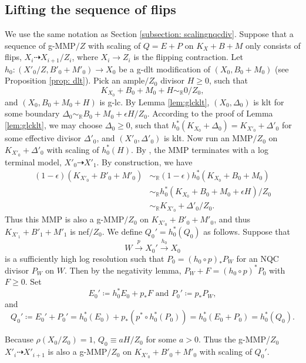 \documentclass[11pt]{amsart}
\newcommand{\Rr}{\mathbb{R}}
\begin{document}
\subsection{Lifting the sequence of flips}
\label{subsection: Lifting a sequence of flips with quasi-scaling}
We use the same notation as Section \ref{subsection: scalingnqcdiv}. Suppose that a sequence of g-MMP$/Z$ with scaling of $Q=E+P$ on $K_{X}+B+M$ only consists of flips, $X_i\dashrightarrow X_{i+1}/Z_i$, where $X_i \to Z_i$ is the flipping contraction.
Let $h_0:(X'_0/Z,B'_0+M'_0)\to X_0$ be a g-dlt modification of $(X_0,B_0+M_0)$ (see Proposition \ref{prop: dlt}). Pick an ample$/Z_0$ divisor $H\ge0$, such that 
$$K_{X_0}+B_0+M_0+H\sim_{\Rr}0/Z_0,$$
and $(X_0,B_0+M_0+H)$ is g-lc. 
By Lemma \ref{lem:glcklt}, $(X_0,\Delta_0)$ is klt for some boundary $\Delta_0\sim_{\Rr} B_0+M_{0}+\epsilon H/Z_0$. According to the proof of Lemma \ref{lem:glcklt}, we may choose $\Delta_0\ge0$, such that $h_0^{*}(K_{X_0}+\Delta_0)=K_{X'_0}+\Delta'_0$
for some effective divisor $\Delta'_0$, and $({X'_0},\Delta'_0)$ is klt. Now run an MMP$/Z_0$ on $K_{X'_0}+\Delta'_0$ with scaling of $h_0^{*}(H)$. By \cite[Corollary 1.4.2]{BCHM10}, the MMP terminates with a log terminal model, $X'_0\dashrightarrow X'_1$. By construction, we have
\begin{align*}
(1-\epsilon)(K_{X'_0}+B'_{0}+M'_{0})&\sim_{\Rr}
(1-\epsilon)h_0^{*}(K_{X_0}+B_{0}+M_{0})\\
&\sim_{\Rr}h_0^{*}(K_{X_0}+B_{0}+M_{0}+\epsilon H)/Z_0\\
&\sim_{\Rr}K_{X'_0}+\Delta'_0/Z_0.
\end{align*}  
Thus this MMP is also a g-MMP$/Z_0$ on $K_{X'_0}+B'_{0}+M'_{0}$, and thus $K_{X'_1}+B'_{1}+M'_{1}$ is nef$/Z_0$. We define $Q_0'=h_0^{*}(Q_0)$ as follows. Suppose that 
\[
W \xrightarrow{p} X_0' \xrightarrow{h_0} X_0
\] is a sufficiently high log resolution such that $P_0=(h_0 \circ p)_* P_W$ for an NQC divisor $P_W$ on $W$. Then by the negativity lemma, $P_W+F=(h_0 \circ p)^*P_0$ with $F \geq 0$. Set 
\begin{equation}\label{eq: E', P'}
E_0'\coloneqq h_0^*E_0+p_*F \text{~and~} P_0' \coloneqq p_*P_W,
\end{equation} and 
\begin{equation}\label{eq: Q'}
Q_0'\coloneqq E_0'+P_0'=h_0^*(E_0)+p_*(p^*\circ h_0^*(P_0))=h_0^*(E_0+P_0)=h_0^*(Q_0).
\end{equation}

 Because $\rho(X_0/Z_0)=1$, $Q_0\equiv aH/Z_0$ for some $a>0$. Thus the g-MMP/$Z_0$ $X'_i \dashrightarrow X'_{i+1}$ is also a g-MMP$/Z_0$ on $K_{X'_0}+B'_{0}+M'_{0}$ with scaling of $Q_0'$.
\end{document}
